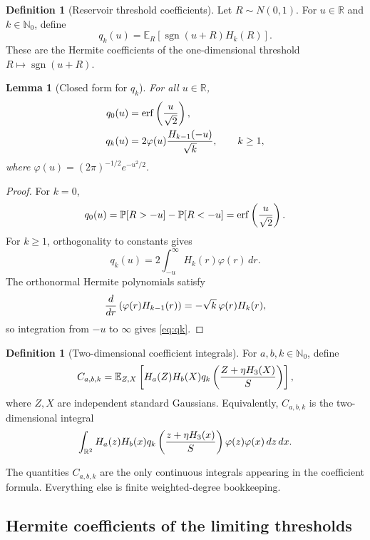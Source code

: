 \documentclass[11pt]{article}
\newcommand{\R}{\mathbb R}
\newcommand{\Nzero}{\mathbb N_0}
\newcommand{\E}{\mathbb E}
\newcommand{\Prob}{\mathbb P}
\newcommand{\1}{\mathbf 1}
\newcommand{\sgn}{\operatorname{sgn}}
\theoremstyle{plain}
\newtheorem{lemma}[theorem]{Lemma}
\theoremstyle{definition}
\newtheorem{definition}[theorem]{Definition}
\theoremstyle{remark}
\begin{document}
\begin{definition}[Reservoir threshold coefficients]\label{def:qk}
Let $R\sim N(0,1)$.  For $u\in\R$ and $k\in\Nzero$, define
\[
  q_k(u)=\E_R[\sgn(u+R)H_k(R)].
\]
These are the Hermite coefficients of the one-dimensional threshold $R\mapsto \sgn(u+R)$.
\end{definition}

\begin{lemma}[Closed form for $q_k$]\label{lem:qk}
For all $u\in\R$,
\begin{align}
  q_0(u)&=\operatorname{erf}\left({u\over\sqrt2}\right),\label{eq:q0}\\
  q_k(u)&=2\varphi(u){H_{k-1}(-u)\over\sqrt{k}},\qquad k\ge1,\label{eq:qk}
\end{align}
where $\varphi(u)=(2\pi)^{-1/2}e^{-u^2/2}$.
\end{lemma}

\begin{proof}
For $k=0$,
\[
  q_0(u)=\Prob[R>-u]-\Prob[R<-u]=\operatorname{erf}\left({u\over\sqrt2}\right).
\]
For $k\ge1$, orthogonality to constants gives
\[
  q_k(u)=2\int_{-u}^{\infty}H_k(r)\varphi(r)\,dr.
\]
The orthonormal Hermite polynomials satisfy
\[
  {d\over dr}\left(\varphi(r)H_{k-1}(r)\right)
  =-\sqrt{k}\,\varphi(r)H_k(r),
\]
so integration from $-u$ to $\infty$ gives \eqref{eq:qk}.
\end{proof}

\begin{definition}[Two-dimensional coefficient integrals]\label{def:Cabk}
For $a,b,k\in\Nzero$, define
\begin{equation}\label{eq:C-abk}
  C_{a,b,k}
  =\E_{Z,X}\left[H_a(Z)H_b(X)
    q_k\left({Z+\eta H_3(X)\over S}\right)\right],
\end{equation}
where $Z,X$ are independent standard Gaussians.  Equivalently, $C_{a,b,k}$ is the two-dimensional integral
\[
  \int_{\R^2}H_a(z)H_b(x)
  q_k\left({z+\eta H_3(x)\over S}\right)\varphi(z)\varphi(x)\,dz\,dx.
\]
\end{definition}

The quantities $C_{a,b,k}$ are the only continuous integrals appearing in the coefficient formula.  Everything else is finite weighted-degree bookkeeping.

\subsection{Hermite coefficients of the limiting thresholds}\label{subsec:threshold-hermite-coefficients}
\end{document}
